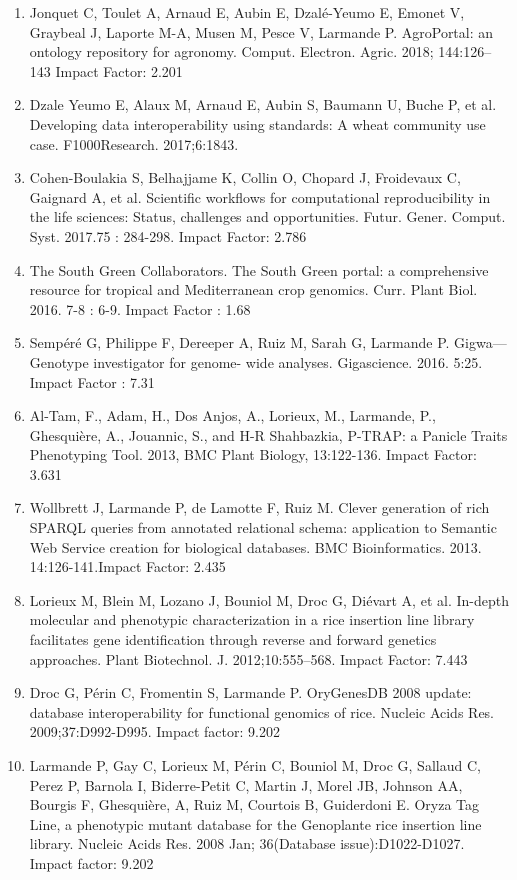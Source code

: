 \begin{enumerate}
\item	Jonquet C, Toulet A, Arnaud E, Aubin E, Dzalé-Yeumo E, Emonet V, Graybeal J, Laporte M-A, Musen M, Pesce V, Larmande P. AgroPortal: an ontology repository for agronomy. Comput. Electron. Agric. 2018; 144:126–143 Impact Factor: 2.201
\item	Dzale Yeumo E, Alaux M, Arnaud E, Aubin S, Baumann U, Buche P, et al. Developing data interoperability using standards: A wheat community use case. F1000Research. 2017;6:1843.
\item	Cohen-Boulakia S, Belhajjame K, Collin O, Chopard J, Froidevaux C, Gaignard A, et al. Scientific workflows for computational reproducibility in the life sciences: Status, challenges and opportunities. Futur. Gener. Comput. Syst. 2017.75 : 284-298. Impact Factor: 2.786
\item	The South Green Collaborators. The South Green portal: a comprehensive resource for tropical and Mediterranean crop genomics. Curr. Plant Biol. 2016. 7-8 : 6-9. Impact Factor : 1.68
\item	Sempéré G, Philippe F, Dereeper A, Ruiz M, Sarah G, Larmande P. Gigwa—Genotype investigator for genome- wide analyses. Gigascience. 2016. 5:25. Impact Factor : 7.31
\item	Al-Tam, F., Adam, H., Dos Anjos, A., Lorieux, M., Larmande, P., Ghesquière, A., Jouannic, S., and H-R Shahbazkia, P-TRAP: a Panicle Traits Phenotyping Tool. 2013, BMC Plant Biology, 13:122-136. Impact Factor: 3.631
\item	Wollbrett J, Larmande P, de Lamotte F, Ruiz M. Clever generation of rich SPARQL queries from annotated relational schema: application to Semantic Web Service creation for biological databases. BMC Bioinformatics. 2013. 14:126-141.Impact Factor: 2.435
\item Lorieux M, Blein M, Lozano J, Bouniol M, Droc G, Diévart A, et al. In-depth molecular and phenotypic characterization in a rice insertion line library facilitates gene identification through reverse and forward genetics approaches. Plant Biotechnol. J. 2012;10:555–568. Impact Factor: 7.443
\item	Droc G, Périn C, Fromentin S, Larmande P. OryGenesDB 2008 update: database interoperability for functional genomics of rice. Nucleic Acids Res. 2009;37:D992-D995. Impact factor: 9.202
\item	Larmande P, Gay C, Lorieux M, Périn C, Bouniol M, Droc G, Sallaud C, Perez P, Barnola I, Biderre-Petit C, Martin J, Morel JB, Johnson AA, Bourgis F, Ghesquière, A, Ruiz M, Courtois B, Guiderdoni E. Oryza Tag Line, a phenotypic mutant database for the Genoplante rice insertion line library. Nucleic Acids Res. 2008 Jan; 36(Database issue):D1022-D1027. Impact factor: 9.202

\end{enumerate}
